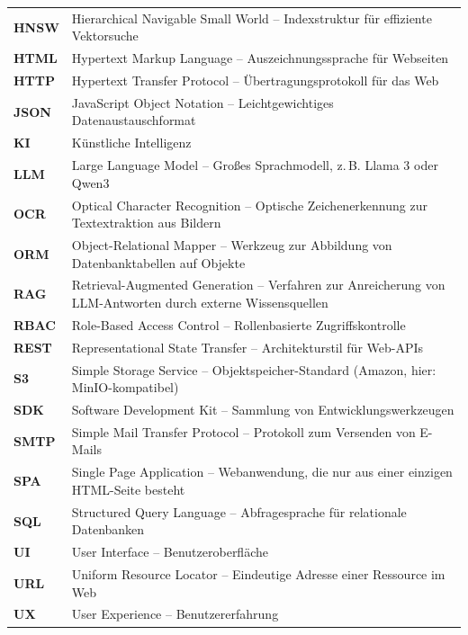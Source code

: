 \begin{longtable}{@{}p{3.5cm}p{12cm}@{}}
\textbf{HNSW}   & Hierarchical Navigable Small World -- Indexstruktur für effiziente Vektorsuche \\[4pt]
\textbf{HTML}   & Hypertext Markup Language -- Auszeichnungssprache für Webseiten \\[4pt]
\textbf{HTTP}   & Hypertext Transfer Protocol -- Übertragungsprotokoll für das Web \\[4pt]
\textbf{JSON}   & JavaScript Object Notation -- Leichtgewichtiges Datenaustauschformat \\[4pt]
\textbf{KI}     & Künstliche Intelligenz \\[4pt]
\textbf{LLM}    & Large Language Model -- Großes Sprachmodell, z.\,B. Llama 3 oder Qwen3 \\[4pt]
\textbf{OCR}    & Optical Character Recognition -- Optische Zeichenerkennung zur Textextraktion aus Bildern \\[4pt]
\textbf{ORM}    & Object-Relational Mapper -- Werkzeug zur Abbildung von Datenbanktabellen auf Objekte \\[4pt]
\textbf{RAG}    & Retrieval-Augmented Generation -- Verfahren zur Anreicherung von LLM-Antworten durch externe Wissensquellen \\[4pt]
\textbf{RBAC}   & Role-Based Access Control -- Rollenbasierte Zugriffskontrolle \\[4pt]
\textbf{REST}   & Representational State Transfer -- Architekturstil für Web-APIs \\[4pt]
\textbf{S3}     & Simple Storage Service -- Objektspeicher-Standard (Amazon, hier: MinIO-kompatibel) \\[4pt]
\textbf{SDK}    & Software Development Kit -- Sammlung von Entwicklungswerkzeugen \\[4pt]
\textbf{SMTP}   & Simple Mail Transfer Protocol -- Protokoll zum Versenden von E-Mails \\[4pt]
\textbf{SPA}    & Single Page Application -- Webanwendung, die nur aus einer einzigen HTML-Seite besteht \\[4pt]
\textbf{SQL}    & Structured Query Language -- Abfragesprache für relationale Datenbanken \\[4pt]
\textbf{UI}     & User Interface -- Benutzeroberfläche \\[4pt]
\textbf{URL}    & Uniform Resource Locator -- Eindeutige Adresse einer Ressource im Web \\[4pt]
\textbf{UX}     & User Experience -- Benutzererfahrung \\[4pt]

\end{longtable}
